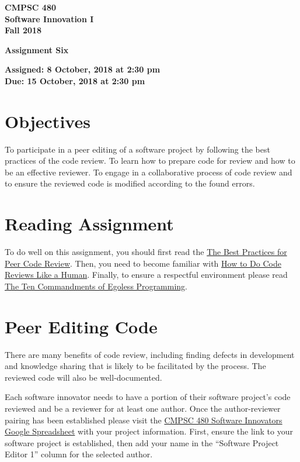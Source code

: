 \documentclass[11pt]{article}
\newcommand{\assignmentduedate}{15 October}
\newcommand{\assignmentassignedate}{ 8 October}
\newcommand{\assignmentnumber}{Six}
\newcommand{\labyear}{2018}
\newcommand{\labtime}{2:30 pm}
\newcommand{\assigneddate}{Assigned:  \assignmentassignedate, \labyear{} at \labtime{}}
\newcommand{\duedate}{Due:  \assignmentduedate, \labyear{} at \labtime{}}
\newcommand{\labtitle}[1]
{
  \begin{center}
    \begin{center}
      \bf
      CMPSC 480 \\ Software Innovation I\\
      Fall 2018\\
      \medskip
    \end{center}
    \bf
    #1
  \end{center}
}
\begin{document}
\thispagestyle{empty}

\labtitle{Assignment \assignmentnumber{} }
\begin{center} \textbf{ \assigneddate{} \\ \duedate{} } \end{center} 
\noindent \textbf{ }

\section*{Objectives}


To participate in a peer editing of a software project by following the best practices of the code review. To learn how to prepare code for review and how to be an effective reviewer. To engage in a collaborative process of code review and to ensure the reviewed code is modified according to the found errors. 

\section*{Reading Assignment}

To do well on this assignment, you
should first read the \href{https://smartbear.com/learn/code-review/best-practices-for-peer-code-review/}{The Best Practices for Peer Code Review}.
Then, you need to become familiar with \href{https://mtlynch.io/human-code-reviews-1/}{How to Do Code Reviews Like a Human}. Finally, to ensure a respectful environment please read \href{
https://blog.codinghorror.com/the-ten-commandments-of-egoless-programming/}{The Ten Commandments of Egoless Programming}.

\section*{Peer Editing Code}
There are many  benefits of code review, including finding defects in development and knowledge sharing that is likely to be facilitated by the process. The reviewed code will also be well-documented.

Each software innovator needs to have a portion of their software project's code reviewed and be a reviewer for at least one author. Once the author-reviewer pairing has been established please visit the \href{https://docs.google.com/spreadsheets/d/1p5N6JGmYllYSUAc4E1CcibHz30lQqyM_ZC1RfTphdEI/edit?usp=sharing}{CMPSC 480 Software Innovators Google Spreadsheet} with your project information. First, ensure the link to your software project is established, then add your name in the ``Software Project Editor 1'' column for the selected author. 
\end{document}
